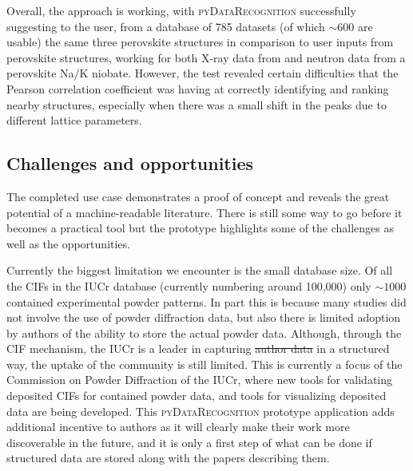 \documentclass[preprint]{iucr}
\newcommand{\pydr}{\textsc{pyDataRecognition}\xspace}
\providecommand{\DIFadd}[1]{{\protect\color{blue}\uwave{#1}}} %
\providecommand{\DIFdel}[1]{{\protect\color{red}\sout{#1}}}                      %
\providecommand{\DIFaddbegin}{} %
\providecommand{\DIFaddend}{} %
\providecommand{\DIFdelbegin}{} %
\providecommand{\DIFdelend}{} %
\newcommand{\DIFscaledelfig}{0.5}
\newlength{\DIFdelgraphicswidth} %
\newlength{\DIFdelgraphicsheight} %
\newcommand{\DIFaddincludegraphics}[2][]{{\color{blue}\fbox{\DIFOincludegraphics[#1]{#2}}}} %
\newcommand{\DIFdelincludegraphics}[2][]{%
\sbox{\DIFdelgraphicsbox}{\DIFOincludegraphics[#1]{#2}}%
\settoboxwidth{\DIFdelgraphicswidth}{\DIFdelgraphicsbox} %
\settoboxtotalheight{\DIFdelgraphicsheight}{\DIFdelgraphicsbox} %
\scalebox{\DIFscaledelfig}{%
\parbox[b]{\DIFdelgraphicswidth}{\usebox{\DIFdelgraphicsbox}\\[-\baselineskip] \rule{\DIFdelgraphicswidth}{0em}}\llap{\resizebox{\DIFdelgraphicswidth}{\DIFdelgraphicsheight}{%
\setlength{\unitlength}{\DIFdelgraphicswidth}%
\begin{picture}(1,1)%
\thicklines\linethickness{2pt} %
{\color[rgb]{1,0,0}\put(0,0){\framebox(1,1){}}}%
{\color[rgb]{1,0,0}\put(0,0){\line( 1,1){1}}}%
{\color[rgb]{1,0,0}\put(0,1){\line(1,-1){1}}}%
\end{picture}%
}\hspace*{3pt}}} %
} %
\DeclareRobustCommand{\DIFaddbegin}{\DIFOaddbegin \let\includegraphics\DIFaddincludegraphics} %
\DeclareRobustCommand{\DIFaddend}{\DIFOaddend \let\includegraphics\DIFOincludegraphics} %
\DeclareRobustCommand{\DIFdelbegin}{\DIFOdelbegin \let\includegraphics\DIFdelincludegraphics} %
\DeclareRobustCommand{\DIFdelend}{\DIFOaddend \let\includegraphics\DIFOincludegraphics} %
\begin{document}
Overall, the approach is working, with \pydr successfully suggesting to the user, from a database of 785 datasets (of which $\sim 600$ are usable) the same three perovskite structures in comparison to user inputs from perovskite structures, working for both X-ray data from  and neutron data from a perovskite Na/K niobate.   However, the test revealed certain difficulties that the Pearson correlation coefficient was having at correctly identifying and ranking nearby structures, especially when there was a small shift in the peaks due to different lattice parameters.

\subsection{Challenges and opportunities}
\label{sec:challengesandopportunities}

The completed use case demonstrates a proof of concept and reveals the great potential of a machine-readable literature.  There is still some way to go before it becomes a practical tool but the prototype highlights some of the challenges as well as the opportunities.

Currently the biggest limitation we encounter is the small database size. Of all the CIFs in the IUCr database (currently numbering around 100,000) only $\sim 1000$  contained experimental powder patterns. In part this is because many studies did not involve the use of powder diffraction data, but also there is limited adoption by authors of the ability to store the actual powder data.  Although, through the CIF mechanism, the IUCr is a leader in capturing \DIFdelbegin \DIFdel{author data }\DIFdelend \DIFaddbegin \DIFadd{the powder diffraction data of authors }\DIFaddend in a structured way, the uptake of the community is still limited.  This is currently a focus of the Commission on Powder Diffraction of the IUCr, where new tools for validating deposited CIFs for contained powder data, and tools for visualizing deposited data are being developed.  This \pydr prototype application adds additional incentive to authors as it will clearly make their work more discoverable in the future, and it is only a first step of what can be done if structured data are stored along with the papers describing them.
\end{document}
